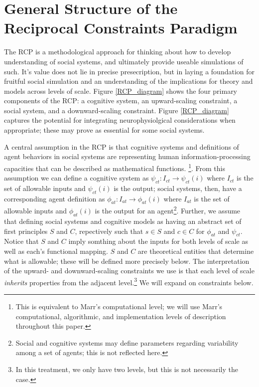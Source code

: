 \documentclass{article}
\begin{document}
\section{General Structure of the Reciprocal Constraints Paradigm}
The RCP is a methodological approach for thinking about how to develop understanding of social systems, and ultimately provide useable simulations of such.  It's value does not lie in precise presecription, but in laying a foundation for fruitful social simulation and an understanding of the implications for theory and models across levels of scale.  Figure \ref{RCP_diagram} shows the four primary components of the RCP: a cognitive system, an upward-scaling constraint, a social system, and a downward-scaling constraint.  Figure \ref{RCP_diagram} captures the potential for integrating neurophysiolgical considerations when appropriate; these may prove as essential for some social systems.

A central assumption in the RCP is that cognitive systems and definitions of agent behaviors in social systems are representing human information-processing capacities that can be described as mathematical functions. \cite{van Rooij, 2008}\footnote{This is equivalent to Marr's computational level; we will use Marr's computational, algorithmic, and implementation levels of description\cite{Marr,1981} throughout this paper.}. From this assumption we can define a cognitive system as $\psi_{ct}: I_{ct} \rightarrow \psi_{ct}(i)$ where $I_{ct}$ is the set of allowable inputs and $\psi_{ct}(i)$ is the output; social systems, then, have a corresponding agent definition as $\phi_{at}: I_{at} \rightarrow \phi_{at}(i)$ where $I_{at}$ is the set of allowable inputs and $\phi_{at}(i)$ is the output for an agent\footnote{Social and cognitive systems may define parameters regarding variability among a set of agents; this is not reflected here.}.   Further, we assume that defining social systems and cognitive models as having an abstract set of first principles $S$ and $C$, repectively such that $s \in S$ and $c \in C$ for $\phi_{at}$ and $\psi_{ct}$. Notice that $S$ and $C$ imply somthing about the inputs for both levels of scale as well as each's functional mapping.  $S$ and $C$ are theoretical entities that determine what is allowable; these will be defined more precisely below. The interpretation of the upward- and downward-scaling constraints we use is that each level of scale \textit{inherits} properties from the adjacent level.\footnote{In this treatment, we only have two levels, but this is not necessarily the case.}  We will expand on constraints below. 
\end{document}
